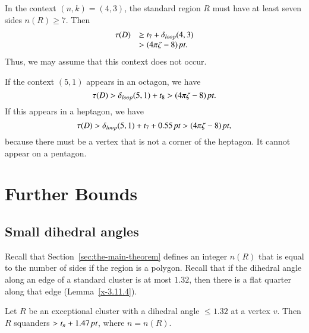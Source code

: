 In the context $(n,k)=(4,3)$, the standard region $R$ must have at
least seven sides $n(R)\ge7$.   Then
    $$
    \begin{array}{lll}
    \tau(D)&\ge t_7+{\delta}_{loop}(4,3)\\
            &>(4\pi\zeta-8)\,\hbox{\it pt}.
    \end{array}
    $$
Thus, we may assume that this context does not occur.

If the context $(5,1)$ appears in an octagon, we have
    $$\tau(D) >{\delta}_{loop}(5,1)+t_8>(4\pi\zeta-8)\,\hbox{\it pt}.$$
If this appears in a heptagon, we have
$$\tau(D) >{\delta}_{loop}(5,1) + t_7+ 0.55\,\hbox{\it pt} > (4\pi\zeta-8)\,\hbox{\it pt},$$
because there must be a vertex that is not a corner of the
heptagon. It cannot appear on a pentagon.





\chapter{Further Bounds}%
    \label{sec:fb}



\section{Small dihedral angles} %
\label{sec:small-dih}

Recall that Section~\ref{sec:the-main-theorem} defines an integer $n(R)$
that is equal to the number of sides if the region is a polygon.  Recall
that if the dihedral angle along an edge of a standard cluster is at
most $1.32$, then there is a flat quarter along that edge
(Lemma~\ref{x-3.11.4}).

\begin{lemma}
Let $R$ be an exceptional cluster with a dihedral angle
$\le1.32$ at a vertex $v$. Then $R$ squanders $>t_n+1.47\,\hbox{\it pt}$, where
$n=n(R)$.
\end{lemma}

